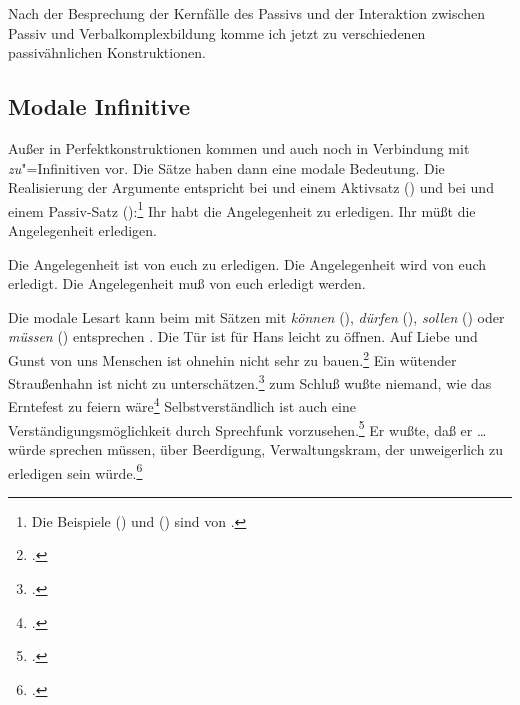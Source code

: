 Nach der Besprechung der Kernfälle des Passivs und der Interaktion zwischen Passiv und Verbalkomplexbildung
komme ich jetzt zu verschiedenen passivähnlichen Konstruktionen.

\subsection{Modale Infinitive}
\label{sec-modal-inf}


Außer%
%
in Perfektkonstruktionen kommen \haben und \sein auch noch in Verbindung mit \emph{zu}"=Infinitiven
vor. Die Sätze haben dann eine modale Bedeutung.
Die Realisierung der Argumente entspricht bei \zuinf und \haben einem Aktivsatz ()
und bei \zuinf und \sein einem Passiv-Satz ():\footnote{
        Die Beispiele () und () sind von \citet*[]{Bierwisch63a}.
}
\eal
\label{ex-habt-zu-erledigen}
\ex Ihr habt die Angelegenheit zu erledigen.
\ex Ihr müßt die Angelegenheit erledigen.
\zl

\eal
\label{ex-ist-zu-erledigen}
\ex Die Angelegenheit ist von euch zu erledigen.
\ex Die Angelegenheit wird von euch erledigt.
\ex Die Angelegenheit muß von euch erledigt werden.
\zl


\noindent
Die modale Lesart kann beim \zuinf mit \sein Sätzen mit
\emph{können} (), \emph{dürfen} (), \emph{sollen} ()
oder \emph{müssen} () entsprechen \citep[Kapitel~2]{Gelhaus77}.
\ea
Die Tür ist für Hans leicht zu öffnen.
\z
\eal
\ex Auf Liebe und Gunst von uns Menschen ist ohnehin nicht sehr zu bauen.\footnote{
        .
}
\ex Ein wütender Straußenhahn ist nicht zu unterschätzen.\footnote{
        .%
}
\zl
\ea
zum Schluß wußte niemand, wie das Erntefest zu feiern wäre\footnote{
        .
}
\z
\eal
\ex Selbstverständlich ist auch eine Verständigungsmöglichkeit durch Sprechfunk vorzusehen.\footnote{
        .
}
\ex Er wußte, daß er \ldots{} würde sprechen müssen, über Beerdigung, Verwaltungskram, der unweigerlich
    zu erledigen sein würde.\footnote{
        .
}

